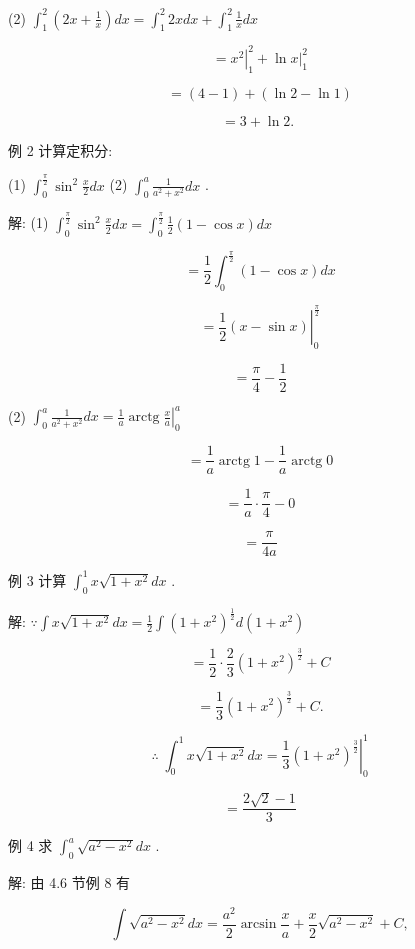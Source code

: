 \documentclass[lang=cn,newtx,10pt,scheme=chinese]{elegantbook}
\begin{document}
(2) \({\int }_{1}^{2}\left( {{2x} + \frac{1}{x}}\right) {dx} = {\int }_{1}^{2}{2xdx} + {\int }_{1}^{2}\frac{1}{x}{dx}\)

\[
= {\left. {x}^{2}\right| }_{1}^{2} + {\left. \ln x\right| }_{1}^{2}
\]

\[
= \left( {4 - 1}\right) + \left( {\ln 2 - \ln 1}\right)
\]

\[
= 3 + \ln 2\text{. }
\]

例 2 计算定积分:

(1) \({\int }_{0}^{\frac{\pi }{2}}{\sin }^{2}\frac{x}{2}{dx}\) (2) \({\int }_{0}^{a}\frac{1}{{a}^{2} + {x}^{2}}{dx}\) .

解: (1) \({\int }_{0}^{\frac{\pi }{2}}{\sin }^{2}\frac{x}{2}{dx} = {\int }_{0}^{\frac{\pi }{2}}\frac{1}{2}\left( {1 - \cos x}\right) {dx}\)

\[
= \frac{1}{2}{\int }_{0}^{\frac{\pi }{2}}\left( {1 - \cos x}\right) {dx}
\]

\[
= {\left. \frac{1}{2}\left( x - \sin x\right) \right| }_{0}^{\frac{\pi }{2}}
\]

\[
= \frac{\pi }{4} - \frac{1}{2}
\]

(2) \({\int }_{0}^{a}\frac{1}{{a}^{2} + {x}^{2}}{dx} = {\left. \frac{1}{a}\operatorname{arctg}\frac{x}{a}\right| }_{0}^{a}\)

\[
= \frac{1}{a}\operatorname{arctg}1 - \frac{1}{a}\operatorname{arctg}0
\]

\[
= \frac{1}{a} \cdot \frac{\pi }{4} - 0
\]

\[
= \frac{\pi }{4a}
\]

例 3 计算 \({\int }_{0}^{1}x\sqrt{1 + {x}^{2}}{dx}\) .

解: \(\because \int x\sqrt{1 + {x}^{2}}{dx} = \frac{1}{2}\int {\left( 1 + {x}^{2}\right) }^{\frac{1}{2}}d\left( {1 + {x}^{2}}\right)\)

\[
= \frac{1}{2} \cdot \frac{2}{3}{\left( 1 + {x}^{2}\right) }^{\frac{3}{2}} + C
\]

\[
= \frac{1}{3}{\left( 1 + {x}^{2}\right) }^{\frac{3}{2}} + C\text{.}
\]

\[
\therefore \;{\int }_{0}^{1}x\sqrt{1 + {x}^{2}}{dx} = {\left. \frac{1}{3}{\left( 1 + {x}^{2}\right) }^{\frac{3}{2}}\right| }_{0}^{1}
\]

\[
= \frac{2\sqrt{2} - 1}{3}
\]

例 4 求 \({\int }_{0}^{a}\sqrt{{a}^{2} - {x}^{2}}{dx}\) .

解: 由 4.6 节例 8 有

\[
\int \sqrt{{a}^{2} - {x}^{2}}{dx} = \frac{{a}^{2}}{2}\arcsin \frac{x}{a} + \frac{x}{2}\sqrt{{a}^{2} - {x}^{2}} + C,
\]
\end{document}
